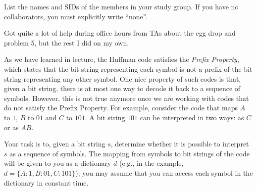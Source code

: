 \documentclass[11pt]{article}
\begin{document}
List the names and SIDs of the members in your study group.
If you have no collaborators, you must explicitly write ``none''.

\begin{solution}
	Got quite a lot of help during office hours from TAs about the egg drop and problem 5, but the rest I did 
	on my own. 
\end{solution}

\newpage


As we have learned in lecture, the Huffman code satisfies the \emph{Prefix Property}, which states that the bit string representing each symbol is not a prefix of the bit string representing any other symbol. One nice property of such codes is that, given a bit string, there is at most one way to decode it back to a sequence of symbols. However, this is not true anymore once we are working with codes that do not satisfy the Prefix Property. For example, consider the code that maps $A$ to $1$, $B$ to $01$ and $C$ to $101$. A bit string $101$ can be interpreted in two ways: as $C$ or as $AB$.

Your task is to, given a bit string $s$, determine whether it is possible to interpret $s$ as a sequence of symbols. The mapping from symbols to bit strings of the code will be given to you as a dictionary $d$ (e.g., in the example, $d = \{A: 1, B: 01, C: 101\}$); you may assume that you can access each symbol in the dictionary in constant time. 
\end{document}
